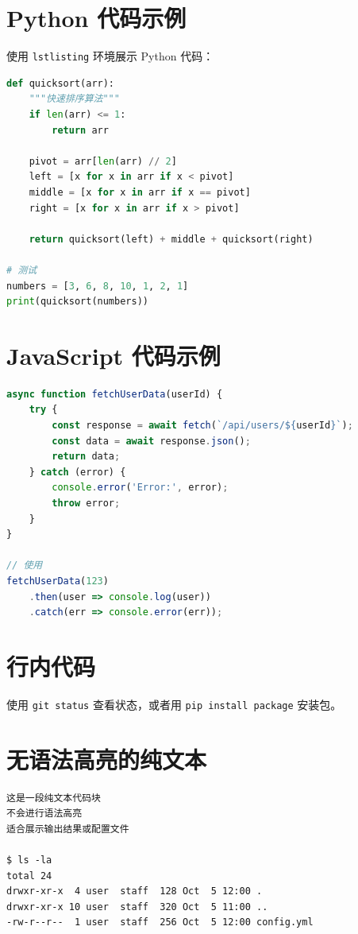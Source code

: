 \documentclass{ctexart}
\author{odlove}
\date{\today}
\begin{document}
\section{Python 代码示例}

使用 \texttt{lstlisting} 环境展示 Python 代码：

\begin{lstlisting}[language=Python, caption=快速排序实现]
def quicksort(arr):
    """快速排序算法"""
    if len(arr) <= 1:
        return arr

    pivot = arr[len(arr) // 2]
    left = [x for x in arr if x < pivot]
    middle = [x for x in arr if x == pivot]
    right = [x for x in arr if x > pivot]

    return quicksort(left) + middle + quicksort(right)

# 测试
numbers = [3, 6, 8, 10, 1, 2, 1]
print(quicksort(numbers))
\end{lstlisting}

\section{JavaScript 代码示例}

\begin{lstlisting}[language=JavaScript, caption=异步请求]
async function fetchUserData(userId) {
    try {
        const response = await fetch(`/api/users/${userId}`);
        const data = await response.json();
        return data;
    } catch (error) {
        console.error('Error:', error);
        throw error;
    }
}

// 使用
fetchUserData(123)
    .then(user => console.log(user))
    .catch(err => console.error(err));
\end{lstlisting}

\section{行内代码}

使用 \verb|git status| 查看状态，或者用 \texttt{pip install package} 安装包。

\section{无语法高亮的纯文本}

\begin{verbatim}
这是一段纯文本代码块
不会进行语法高亮
适合展示输出结果或配置文件

$ ls -la
total 24
drwxr-xr-x  4 user  staff  128 Oct  5 12:00 .
drwxr-xr-x 10 user  staff  320 Oct  5 11:00 ..
-rw-r--r--  1 user  staff  256 Oct  5 12:00 config.yml
\end{verbatim}
\end{document}
